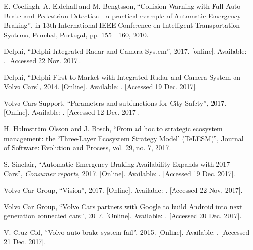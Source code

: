 \documentclass[conference]{IEEEtran}
\begin{document}
\begin{thebibliography}{00}
	E. Coelingh, A. Eidehall and M. Bengtsson,
	``Collision Warning with Full Auto Brake and Pedestrian Detection - a practical example of Automatic Emergency Braking'',
	in 13th International IEEE Conference on Intelligent Transportation Systems, 
	Funchal, Portugal,
	pp. 155 - 160,
	2010.
	
	Delphi,
	``Delphi Integrated Radar and Camera System'',
	2017.
	[online]. Available: .
	[Accessed 22 Nov. 2017].
	
	Delphi,
	``Delphi First to Market with Integrated Radar and Camera System on Volvo Cars'',
	2014.
	[Online]. Available: .
	[Accessed 19 Dec. 2017].
	
	Volvo Cars Support,
	``Parameters and subfunctions for City Safety'',
	2017.
	[Online]. Available: 
	.
	[Accessed 12 Dec. 2017].
	
	H. Holmstr\"{o}m Olsson and J. Bosch,
	``From ad hoc to strategic ecosystem management: the `Three-Layer Ecosystem Strategy Model' (TeLESM)'',
	Journal of Software: Evolution and Process,
	vol. 29, no. 7, 
	2017.
	
	S. Sinclair,
	``Automatic Emergency Braking Availability Expands with 2017 Cars'',
	\emph{Consumer reports},
	2017.
	[Online]. Available:
	.
	[Accessed 19 Dec. 2017].
	
	Volvo Car Group,
	``Vision'',
	2017.
	[Online]. Available: 
	. 
	[Accessed 22 Nov. 2017].
	
	Volvo Car Group,
	``Volvo Cars partners with Google to build Android into next generation connected cars'',
	2017.
	[Online]. Available:
	.
	[Accessed 20 Dec. 2017].
	
	V. Cruz Cid,
	``Volvo auto brake system fail'',
	2015.
	[Online]. Available:
	.
	[Accessed 21 Dec. 2017].
	

\end{thebibliography}
\end{document}
